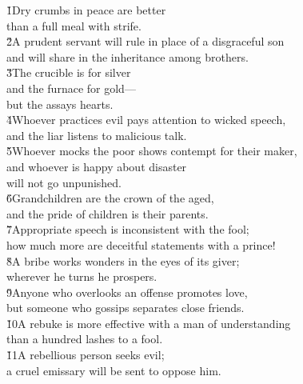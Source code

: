 \begin{poetry}
\poeml {}
\v{1}Dry crumbs in peace are better \\
\poeml than a full meal with strife. \\
\poeml \v{2}A prudent servant will rule in place of a disgraceful son \\
\poemll    and will share in the inheritance among brothers. \\
\poeml \v{3}The crucible is for silver \\
\poemll    and the furnace for gold--- \\
\poemlll       but the  assays hearts. \\
\poeml \v{4}Whoever practices evil pays attention to wicked speech, \\
\poemll    and the liar listens to malicious talk. \\
\poeml \v{5}Whoever mocks the poor shows contempt for their maker, \\
\poemll    and whoever is happy about disaster \\
\poemlll       will not go unpunished. \\
\poeml \v{6}Grandchildren are the crown of the aged, \\
\poemll    and the pride of children is their parents. \\
\poeml \v{7}Appropriate speech is inconsistent with the fool; \\
\poemll    how much more are deceitful statements with a prince! \\
\poeml \v{8}A bribe works wonders in the eyes of its giver; \\
\poemll    wherever he turns he prospers. \\
\poeml \v{9}Anyone who overlooks an offense promotes love, \\
\poemll    but someone who gossips separates close friends. \\
\poeml \v{10}A rebuke is more effective with a man of understanding \\
\poemll    than a hundred lashes to a fool. \\
\poeml \v{11}A rebellious person seeks evil; \\
\poemll    a cruel emissary will be sent to oppose him. \\

\end{poetry}
